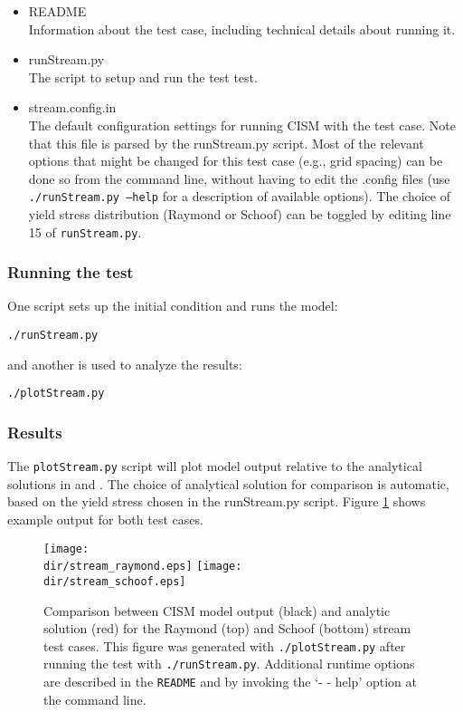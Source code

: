 \begin{itemize}
	\item README \\
		Information about the test case, including technical details about running it.
	\item runStream.py \\
		The script to setup and run the test test.
	\item stream.config.in \\
  The default configuration settings for running CISM with the test case. Note that this
  file is parsed by the runStream.py script. Most of the relevant options that might be changed
  for this test case (e.g., grid spacing) can be done so from the command line, without having to
  edit the .config files (use \texttt{./runStream.py --help} for a description of available options).
  The choice of yield stress distribution (Raymond or Schoof) can be toggled
  by editing line 15 of \texttt{runStream.py}.
\end{itemize}

\subsubsection{Running the test}
One script sets up the initial condition and runs the model:

\texttt{./runStream.py}

\noindent
and another is used to analyze the results:

\texttt{./plotStream.py}

\subsubsection{Results}
The \texttt{plotStream.py} script will plot model output relative to the analytical solutions
in \citet{Raymond2000} and \citet{Schoof2006}. The choice of analytical solution for comparison
is automatic, based on the yield stress chosen in the runStream.py script. 
Figure \ref{fig:stream-results} shows example output for both test cases.
	
\begin{figure}[H!]
  \begin{center}
	\texttt{[image: \\dir/stream\_raymond.eps]}
	\texttt{[image: \\dir/stream\_schoof.eps]}
  \end{center}
  \caption{Comparison between CISM model output (black) and analytic solution (red) for the Raymond (top) and Schoof (bottom) stream test cases. This figure was generated with \texttt{./plotStream.py} after running the test with \texttt{./runStream.py}.
Additional runtime options are described in the \texttt{README} and by invoking the `- - help' option at the command line.}
  \label{fig:stream-results}
\end{figure} 

